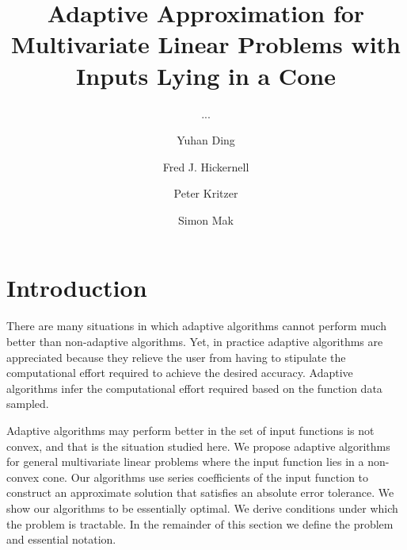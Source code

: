 \documentclass[USenglish]{article}
\begin{document}

  \author[1]{Yuhan Ding}
  \author*[2]{Fred J. Hickernell}
  \author[3]{Peter Kritzer} 
  \author[4]{Simon Mak}
  \title{Adaptive Approximation for Multivariate Linear Problems with Inputs Lying in a Cone}
  \subtitle{...}
  \aop

\maketitle


\section{Introduction} 

There are many situations in which adaptive algorithms cannot perform much better than non-adaptive algorithms.  Yet, in practice adaptive algorithms are appreciated because they relieve the user from having to stipulate the computational effort required to achieve the desired accuracy.  Adaptive algorithms infer the computational effort required based on the function data sampled.

Adaptive algorithms may perform better in the set of input functions is not convex, and that is the situation studied here. We propose adaptive algorithms for general multivariate linear problems where the input function lies in a non-convex cone.  Our algorithms use series coefficients of the input function to construct an approximate solution that satisfies an absolute error tolerance.  We show our algorithms to be essentially optimal.  We derive conditions under which the problem is tractable.  In the remainder of this section we define the problem and essential notation.

\end{document}
